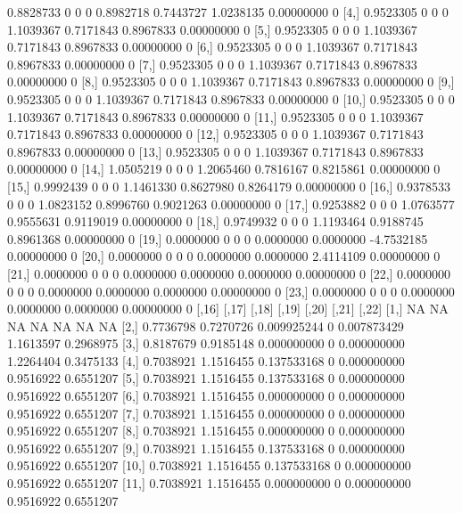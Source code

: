 \documentclass[a4paper]{article}
\begin{document}
\begin{Schunk}
\begin{Soutput}
 [3,] 0.8828733    0    0     0 0.8982718 0.7443727  1.0238135 0.00000000     0
 [4,] 0.9523305    0    0     0 1.1039367 0.7171843  0.8967833 0.00000000     0
 [5,] 0.9523305    0    0     0 1.1039367 0.7171843  0.8967833 0.00000000     0
 [6,] 0.9523305    0    0     0 1.1039367 0.7171843  0.8967833 0.00000000     0
 [7,] 0.9523305    0    0     0 1.1039367 0.7171843  0.8967833 0.00000000     0
 [8,] 0.9523305    0    0     0 1.1039367 0.7171843  0.8967833 0.00000000     0
 [9,] 0.9523305    0    0     0 1.1039367 0.7171843  0.8967833 0.00000000     0
[10,] 0.9523305    0    0     0 1.1039367 0.7171843  0.8967833 0.00000000     0
[11,] 0.9523305    0    0     0 1.1039367 0.7171843  0.8967833 0.00000000     0
[12,] 0.9523305    0    0     0 1.1039367 0.7171843  0.8967833 0.00000000     0
[13,] 0.9523305    0    0     0 1.1039367 0.7171843  0.8967833 0.00000000     0
[14,] 1.0505219    0    0     0 1.2065460 0.7816167  0.8215861 0.00000000     0
[15,] 0.9992439    0    0     0 1.1461330 0.8627980  0.8264179 0.00000000     0
[16,] 0.9378533    0    0     0 1.0823152 0.8996760  0.9021263 0.00000000     0
[17,] 0.9253882    0    0     0 1.0763577 0.9555631  0.9119019 0.00000000     0
[18,] 0.9749932    0    0     0 1.1193464 0.9188745  0.8961368 0.00000000     0
[19,] 0.0000000    0    0     0 0.0000000 0.0000000 -4.7532185 0.00000000     0
[20,] 0.0000000    0    0     0 0.0000000 0.0000000  2.4114109 0.00000000     0
[21,] 0.0000000    0    0     0 0.0000000 0.0000000  0.0000000 0.00000000     0
[22,] 0.0000000    0    0     0 0.0000000 0.0000000  0.0000000 0.00000000     0
[23,] 0.0000000    0    0     0 0.0000000 0.0000000  0.0000000 0.00000000     0
          [,16]      [,17]       [,18] [,19]       [,20]     [,21]      [,22]
 [1,]        NA         NA          NA    NA          NA        NA         NA
 [2,] 0.7736798  0.7270726 0.009925244     0 0.007873429 1.1613597  0.2968975
 [3,] 0.8187679  0.9185148 0.000000000     0 0.000000000 1.2264404  0.3475133
 [4,] 0.7038921  1.1516455 0.137533168     0 0.000000000 0.9516922  0.6551207
 [5,] 0.7038921  1.1516455 0.137533168     0 0.000000000 0.9516922  0.6551207
 [6,] 0.7038921  1.1516455 0.000000000     0 0.000000000 0.9516922  0.6551207
 [7,] 0.7038921  1.1516455 0.000000000     0 0.000000000 0.9516922  0.6551207
 [8,] 0.7038921  1.1516455 0.000000000     0 0.000000000 0.9516922  0.6551207
 [9,] 0.7038921  1.1516455 0.137533168     0 0.000000000 0.9516922  0.6551207
[10,] 0.7038921  1.1516455 0.137533168     0 0.000000000 0.9516922  0.6551207
[11,] 0.7038921  1.1516455 0.000000000     0 0.000000000 0.9516922  0.6551207

\end{Soutput}
\end{Schunk}
\end{document}
